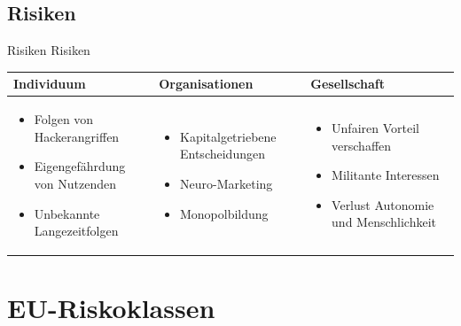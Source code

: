 \documentclass[aspectratio=169,16pt,xcolor=table]{beamer}
\begin{document}
\subsection{Risiken}
\begin{frame}{Risiken}
Risiken
    \begin{table}
    \centering
         \setlength{\leftmargini}{0.4cm}
       \begin{tabular}{| m{4cm} | m{4cm} | m{4cm}|}
        \hline
        \footnotesize{Individuum} & \footnotesize{Organisationen} & \footnotesize{Gesellschaft} \\ 
        \hline
        \begin{itemize}
        \item \scriptsize{Folgen von Hackerangriffen~\cite{khan_aziz_2019}} 
        \item \scriptsize{ Eigengefährdung von Nutzenden~\cite{khan_aziz_2019}}
        \item \scriptsize{ Unbekannte Langezeitfolgen~\cite{Burwell:2017aa}}
        \end{itemize}
        & 
        \begin{itemize}
        \item \scriptsize{Kapitalgetriebene Entscheidungen~\cite{khan_aziz_2019}} 
        \item \scriptsize{ Neuro-Marketing~\cite{khan_aziz_2019}}
        \item \scriptsize{ Monopolbildung~\cite{khan_aziz_2019}}
        \end{itemize}
        &
        \begin{itemize}
        \item \scriptsize{Unfairen Vorteil verschaffen~\cite{khan_aziz_2019} }
        \item \scriptsize{ Militante Interessen~\cite{khan_aziz_2019}}
        \item \scriptsize{ Verlust Autonomie und Menschlichkeit~\cite{Burwell:2017aa}}
        \end{itemize}
        \\
        \hline
    \end{tabular}
    \end{table}
\end{frame}

\section{EU-Riskoklassen}
\end{document}
